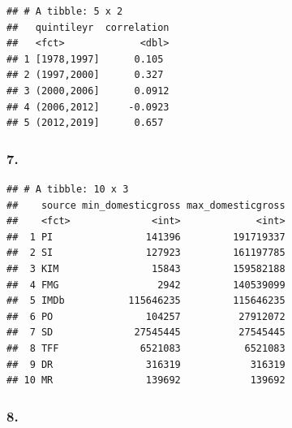 \documentclass[]{article}
\newenvironment{Shaded}{\begin{snugshade}}{\end{snugshade}}
\newcommand{\DataTypeTok}[1]{\textcolor[rgb]{0.13,0.29,0.53}{#1}}
\newcommand{\KeywordTok}[1]{\textcolor[rgb]{0.13,0.29,0.53}{\textbf{#1}}}
\newcommand{\NormalTok}[1]{#1}
\newcommand{\OperatorTok}[1]{\textcolor[rgb]{0.81,0.36,0.00}{\textbf{#1}}}
\newcommand{\StringTok}[1]{\textcolor[rgb]{0.31,0.60,0.02}{#1}}
\begin{document}
\begin{verbatim}
## # A tibble: 5 x 2
##   quintileyr  correlation
##   <fct>             <dbl>
## 1 [1978,1997]      0.105 
## 2 (1997,2000]      0.327 
## 3 (2000,2006]      0.0912
## 4 (2006,2012]     -0.0923
## 5 (2012,2019]      0.657
\end{verbatim}

\hypertarget{section-6}{%
\subsubsection{7.}\label{section-6}}

\begin{Shaded}
\end{Shaded}

\begin{verbatim}
## # A tibble: 10 x 3
##    source min_domesticgross max_domesticgross
##    <fct>              <int>             <int>
##  1 PI                141396         191719337
##  2 SI                127923         161197785
##  3 KIM                15843         159582188
##  4 FMG                 2942         140539099
##  5 IMDb           115646235         115646235
##  6 PO                104257          27912072
##  7 SD              27545445          27545445
##  8 TFF              6521083           6521083
##  9 DR                316319            316319
## 10 MR                139692            139692
\end{verbatim}

\hypertarget{section-7}{%
\subsubsection{8.}\label{section-7}}

\begin{Shaded}
\end{Shaded}
\end{document}
